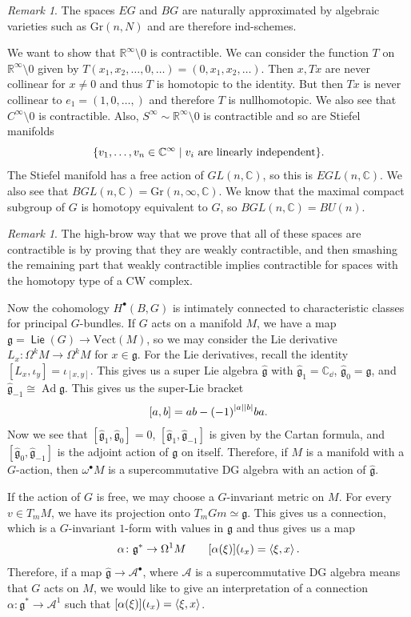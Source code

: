 \documentclass[leqno, openany]{memoir}
\theoremstyle{definition}
\theoremstyle{remark}
\newtheorem{rmk}[thm]{Remark}
\theoremstyle{plain}
\theoremstyle{definition}
\theoremstyle{remark}
\newcommand{\R}{\mathbb{R}}
\newcommand{\C}{\mathbb{C}}
\newcommand{\mf}[1]{\mathfrak{#1}}
\newcommand{\mr}[1]{\mathrm{#1}}
\newcommand{\wh}[1]{\widehat{#1}}
\newcommand{\msc}[1]{\mathscr{#1}}
\DeclareMathOperator{\Ad}{Ad}
\DeclareMathOperator{\Lie}{\mathsf{Lie}}
\begin{document}
\begin{rmk}
    The spaces $EG$ and $BG$ are naturally approximated by algebraic varieties such as $\mr{Gr}(n, N)$ and are therefore ind-schemes.
\end{rmk}

We want to show that $\R^{\infty} \setminus 0$ is contractible. We can consider the function $T$ on $\R^{\infty} \setminus 0$ given by $T(x_1, x_2, \ldots, 0, \ldots) = (0, x_1, x_2, \ldots)$. Then $x, Tx$ are never collinear for $x \neq 0$ and thus $T$ is homotopic to the identity. But then $Tx$ is never collinear to $e_1 = (1, 0, \ldots,)$ and therefore $T$ is nullhomotopic. We also see that $C^{\infty} \setminus 0$ is contractible. Also, $S^{\infty} \sim \R^{\infty} \setminus 0$ is contractible and so are Stiefel manifolds
\[ \qty{v_1, \ldots, v_n \in \C^{\infty} \mid v_i\ \text{are linearly independent}}. \]
The Stiefel manifold has a free action of $GL(n, \C)$, so this is $EGL(n, \C)$. We also see that $BGL(n, \C) = \mr{Gr}(n, \infty, \C)$. We know that the maximal compact subgroup of $G$ is homotopy equivalent to $G$, so $BGL(n, \C) = BU(n)$.

\begin{rmk}
    The high-brow way that we prove that all of these spaces are contractible is by proving that they are weakly contractible, and then smashing the remaining part that weakly contractible implies contractible for spaces with the homotopy type of a CW complex.
\end{rmk}

Now the cohomology $H^{\bullet}(B, G)$ is intimately connected to characteristic classes for principal $G$-bundles. If $G$ acts on a manifold $M$, we have a map $\mf{g} = \Lie(G) \to \mr{Vect}(M)$, so we may consider the Lie derivative $L_x \colon \Omega^k M \to \Omega^k M$ for $x \in \mf{g}$. For the Lie derivatives, recall the identity $[L_x, \iota_y] = \iota_{[x,y]}$. This gives us a super Lie algebra $\wh{\mf{g}}$ with $\wh{\mf{g}}_1 = \C_{\dd}$, $\wh{\mf{g}}_0 = \mf{g}$, and $\wh{\mf{g}}_{-1} \cong \Ad \mf{g}$. This gives us the super-Lie bracket
\[ [a,b] = ab - {(-1)}^{\abs{a} \abs{b}} ba. \]
Now we see that $[\wh{\mf{g}}_1, \wh{\mf{g}}_0] = 0$, $[\wh{\mf{g}}_1, \wh{\mf{g}}_{-1}]$ is given by the Cartan formula, and $[\wh{\mf{g}}_0, \wh{\mf{g}}_{-1}]$ is the adjoint action of $\mf{g}$ on itself. Therefore, if $M$ is a manifold with a $G$-action, then $\omega^{\bullet} M$ is a supercommutative DG algebra with an action of $\wh{\mf{g}}$.

If the action of $G$ is free, we may choose a $G$-invariant metric on $M$. For every $v \in T_m M$, we have its projection onto $T_m Gm \simeq \mf{g}$. This gives us a connection, which is a $G$-invariant $1$-form with values in $\mf{g}$ and thus gives us a map 
\[ \alpha \colon \mf{g}^* \to \Omega^1 M \qquad [\alpha(\xi)] (\iota_x) = \ev{\xi, x}. \]
Therefore, if a map $\wh{\mf{g}} \to \msc{A}^{\bullet}$, where $\msc{A}$ is a supercommutative DG algebra means that $G$ acts on $M$, we would like to give an interpretation of a connection $\alpha \colon \mf{g}^* \to \msc{A}^1$ such that $[\alpha(\xi)] (\iota_x) = \ev{\xi, x}$.
\end{document}
